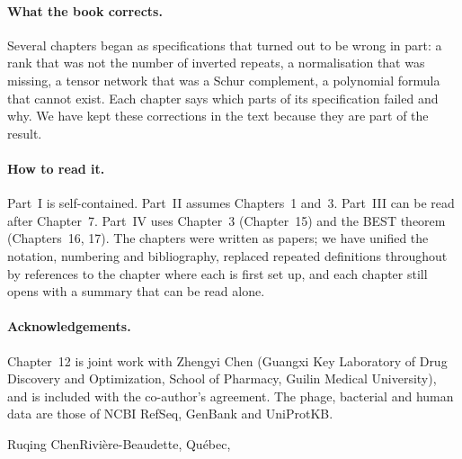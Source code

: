 \paragraph{What the book corrects.} Several chapters began as specifications that turned out to be
wrong in part: a rank that was not the number of inverted repeats, a normalisation that was missing,
a tensor network that was a Schur complement, a polynomial formula that cannot exist. Each chapter
says which parts of its specification failed and why. We have kept these corrections in the text
because they are part of the result.

\paragraph{How to read it.} Part~I is self-contained. Part~II assumes Chapters~1 and~3. Part~III can be
read after Chapter~7. Part~IV uses Chapter~3 (Chapter~15) and the BEST theorem (Chapters~16, 17). The
chapters were written as papers; we have unified the notation, numbering and bibliography, replaced repeated definitions throughout by references to the chapter where each is first set up, and each
chapter still opens with a summary that can be read alone.

\paragraph{Acknowledgements.} Chapter~12 is joint work with Zhengyi Chen (Guangxi Key Laboratory of
Drug Discovery and Optimization, School of Pharmacy, Guilin Medical University), and is included with
the co-author's agreement. The phage, bacterial and human data are those of NCBI RefSeq, GenBank and UniProtKB.

\bigskip
\noindent Ruqing Chen\hfill Rivi\`ere-Beaudette, Qu\'ebec, \AGrelease
